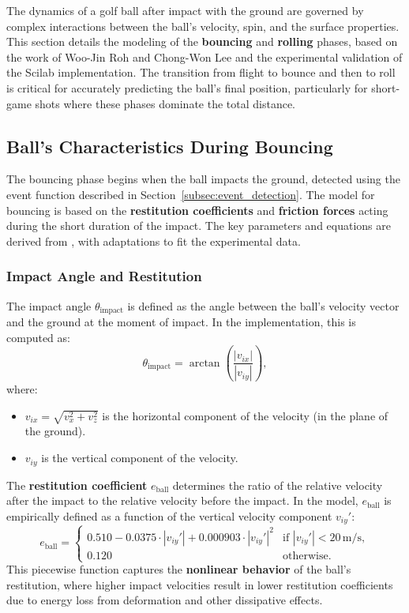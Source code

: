 \documentclass[10pt,a4paper]{report}
\begin{document}
The dynamics of a golf ball after impact with the ground are governed by complex interactions between the ball's 
velocity, spin, and the surface properties. This section details the modeling of the \textbf{bouncing} 
and \textbf{rolling} phases, based on the work of Woo-Jin Roh and Chong-Won Lee \cite{rwlc2010} and 
the experimental validation of the Scilab implementation. The transition from flight to bounce 
and then to roll is critical for accurately predicting the ball's final position, particularly 
for short-game shots where these phases dominate the total distance.


\subsection{Ball's Characteristics During Bouncing}
\label{subsec:bouncing_characteristics}

The bouncing phase begins when the ball impacts the ground, detected using the event function described 
in Section~\ref{subsec:event_detection}. The model for bouncing is based on the 
\textbf{restitution coefficients} and \textbf{friction forces} acting during the 
short duration of the impact. The key parameters and equations are derived from 
\cite{rwlc2010}, with adaptations to fit the experimental data.


\subsubsection{Impact Angle and Restitution}
\label{subsubsec:impact_angle}

The impact angle $\theta_{\text{impact}}$ is defined as the angle between the ball's 
velocity vector and the ground at the moment of impact. In the implementation, this is computed as:
\[
\theta_{\text{impact}} = \arctan\left(\frac{|v_{ix}|}{|v_{iy}|}\right),
\]
where:
\begin{itemize}
    \item $v_{ix} = \sqrt{v_x^2 + v_z^2}$ is the horizontal component of the velocity (in the plane of the ground).
    \item $v_{iy}$ is the vertical component of the velocity.
\end{itemize}

The \textbf{restitution coefficient} $e_{\text{ball}}$ determines the ratio of the relative 
velocity after the impact to the relative velocity before the impact. In the model, 
$e_{\text{ball}}$ is empirically defined as a function of the vertical velocity component $v_{iy}'$:
\[
e_{\text{ball}} =
\begin{cases}
0.510 - 0.0375 \cdot |v_{iy}'| + 0.000903 \cdot |v_{iy}'|^2 & \text{if } |v_{iy}'| < 20 \, \text{m/s}, \\
0.120 & \text{otherwise}.
\end{cases}
\]
This piecewise function captures the \textbf{nonlinear behavior} of 
the ball's restitution, where higher impact velocities result in lower 
restitution coefficients due to energy loss from deformation and other dissipative effects.
\end{document}
